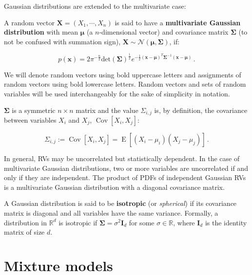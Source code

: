 Gaussian distributions are extended to the multivariate case:

\begin{definition}
  A random vector $\mathbf{X} = (X_1, \cdots, X_n)$ is said to have a \textbf{multivariate Gaussian distribution} with mean $\boldsymbol{\mu}$ (a $n$-dimensional vector) and covariance matrix $\boldsymbol{\Sigma}$ (to not be confused with summation sign), $\mathbf{X} \sim \mathcal{N}\left(\boldsymbol{\mu}, \boldsymbol{\Sigma}\right)$, if:

  \begin{equation}
    p(\mathbf{x}) = 2\pi^{-\frac{n}{2}} \textrm{det}\left(\boldsymbol{\Sigma}\right)^{\frac{1}{2}} e^{-\frac{1}{2}\left(\mathbf{x}-\boldsymbol{\mu}\right)^T\boldsymbol{\Sigma}^{-1}\left(\mathbf{x}-\boldsymbol{\mu}\right)} \, .
  \end{equation}
\end{definition}

\noindent We will denote random vectors using bold uppercase letters and assignments of random vectors using bold lowercase letters. Random vectors and sets of random variables will be used interchangeably for the sake of simplicity in notation.

$\boldsymbol{\Sigma}$ is a symmetric $n \times n$ matrix and the value $\Sigma_{i,j}$ is, by definition, the covariance between variables $X_i$ and $X_j$, $\operatorname{Cov}[X_i, X_j]$:

\begin{equation}
  \Sigma_{i,j} := \operatorname{Cov}[X_i, X_j] = \operatorname{E}\left[(X_i - \mu_i)( X_j - \mu_j)\right] \, .
\end{equation}

In general, RVs may be uncorrelated but statistically dependent. In the case of multivariate Gaussian distributions, two or more variables are uncorrelated if and only if they are independent. The product of PDFs of independent Gaussian RVs is a multivariate Gaussian distribution with a diagonal covariance matrix.

A Gaussian distribution is said to be \textbf{isotropic} (or \emph{spherical}) if its covariance matrix is diagonal and all variables have the same variance. Formally, a distribution in $\mathbb{R}^d$ is isotropic if $\mathbf{\Sigma} = \sigma^2\mathbf{I}_d$ for some $\sigma \in \mathbb{R}$, where $\mathbf{I}_d$ is the identity matrix of size $d$.

\section{Mixture models}
\label{sec:gmm:models}

